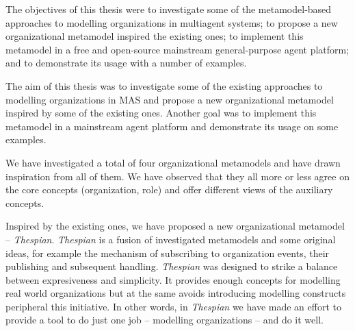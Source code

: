 


The objectives of this thesis were to investigate some of the metamodel-based approaches to modelling organizations in multiagent systems; to propose a new organizational metamodel inspired the existing ones; to implement this metamodel in a free and open-source mainstream general-purpose agent platform; and to demonstrate its usage with a number of examples. 

The aim of this thesis was to investigate some of the existing approaches to modelling organizations in MAS and propose a new organizational metamodel inspired by some of the existing ones.
Another goal was to implement this metamodel in a mainstream agent platform and demonstrate its usage on some examples.

We have investigated a total of four organizational metamodels and have drawn inspiration from all of them.
We have observed that they all more or less agree on the core concepts (organization, role) and offer different views of the auxiliary concepts.

Inspired by the existing ones, we have proposed a new organizational metamodel -- \textit{Thespian}.
\textit{Thespian} is a fusion of investigated metamodels and some original ideas, for example the mechanism of subscribing to organization events, their publishing and subsequent handling.
\textit{Thespian} was designed to strike a balance between expresiveness and simplicity.
It provides enough concepts for modelling real world organizations but at the same avoids introducing modelling constructs peripheral this initiative.
In other words, in \textit{Thespian} we have made an effort to provide a tool to do just one job -- modelling organizations -- and do it well.

